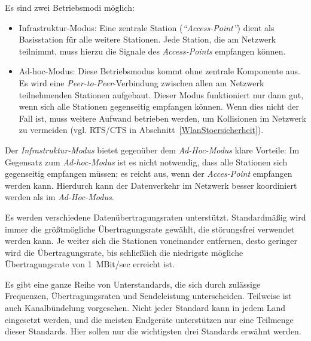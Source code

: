             Es sind zwei Betriebsmodi möglich:

            \begin{itemize}
                \item{Infrastruktur-Modus:} Eine zentrale Station (\emph{"`Access-Point"'}) dient als Basisstation
                                            für alle weitere Stationen. Jede Station, die am Netzwerk
                                            teilnimmt, muss hierzu die Signale des \emph{Access-Points} 
                                            empfangen können.
                \item{Ad-hoc-Modus:} Diese Betriebsmodus kommt ohne zentrale Komponente aus. Es wird eine
                                     \emph{Peer-to-Peer}-Verbindung zwischen allen am Netzwerk teilnehmenden 
                                     Stationen aufgebaut. Dieser Modus funktioniert nur dann gut, wenn sich
                                     alle Stationen gegenseitig empfangen können. Wenn dies nicht der Fall ist,
                                     muss weitere Aufwand betrieben werden, um Kollisionen im Netzwerk zu
                                     vermeiden (vgl. RTS/CTS in Abschnitt~\ref{WlanStoersicherheit}).
                                     
            \end{itemize}

            Der \emph{Infrastruktur-Modus} bietet gegenüber dem \emph{Ad-Hoc-Modus} klare Vorteile: Im Gegensatz
            zum \emph{Ad-hoc-Modus} ist es nicht notwendig, dass alle Stationen sich gegenseitig empfangen
            müssen; es reicht aus, wenn der \emph{Acces-Point} empfangen werden kann. Hierdurch kann der
            Datenverkehr im Netzwerk besser koordiniert werden als im \emph{Ad-Hoc-Modus}. 

            Es werden verschiedene Datenübertragungsraten unterstützt. Standardmäßig wird
            immer die größtmögliche Übertragungsrate gewählt, die störungsfrei verwendet
            werden kann. Je weiter sich die Stationen voneinander entfernen, desto geringer
            wird die Übertragungsrate, bis schließlich die niedrigste mögliche Übertragungsrate von
            1~MBit/sec erreicht ist.

            Es gibt eine ganze Reihe von Unterstandards, die sich durch zulässige Frequenzen, 
            Übertragungsraten und Sendeleistung unterscheiden. Teilweise ist auch Kanalbündelung 
            vorgesehen. Nicht jeder Standard kann in jedem Land eingesetzt werden, und die meisten
            Endgeräte unterstützen nur eine Teilmenge dieser Standards. Hier sollen nur die
            wichtigsten drei Standards erwähnt werden.

